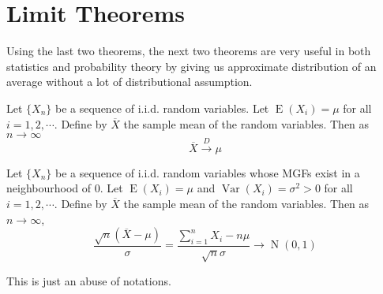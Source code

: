 \documentclass{huhtakm-template-book-v2}
\DeclareMathOperator{\E}{E}
\DeclareMathOperator{\Var}{Var}
\DeclareMathOperator{\N}{N}
\begin{document}
\section{Limit Theorems}
Using the last two theorems, the next two theorems are very useful in both statistics and probability theory by giving us approximate distribution of an average without a lot of distributional assumption.
\begin{thm}
	Let $\{X_{n}\}$ be a sequence of i.i.d. random variables. Let $\E(X_{i})=\mu$ for all $i=1,2,\cdots$. Define by $\overline{X}$ the sample mean of the random variables. Then as $n\to\infty$
	\begin{equation*}
		\overline{X}\xrightarrow{D}\mu
	\end{equation*}
\end{thm}
\begin{thm}
	Let $\{X_{n}\}$ be a sequence of i.i.d. random variables whose MGFs exist in a neighbourhood of $0$. Let $\E(X_{i})=\mu$ and $\Var(X_{i})=\sigma^{2}>0$ for all $i=1,2,\cdots$. Define by $\overline{X}$ the sample mean of the random variables. Then as $n\to\infty$,
	\begin{equation*}
		\frac{\sqrt{n}(\overline{X}-\mu)}{\sigma}=\frac{\sum_{i=1}^{n}X_{i}-n\mu}{\sqrt{n}\sigma}\to\N(0,1)
	\end{equation*}
\end{thm}
\begin{rem}
	This is just an abuse of notations.
\end{rem}
\end{document}

